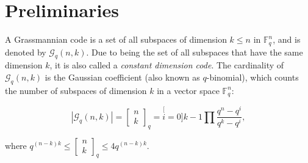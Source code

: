\chapter{Preliminaries} \label{chap:preliminaries}

\begin{defn}
 A Grassmannian code is a set of all subspaces of dimension $k\leq n$
in $\ensuremath{\mathbb{F}}_{q}^{n}$, and is denoted by $\mathcal{G}_{q}\left(n,k\right)$.
Due to being the set of all subspaces that have the same dimension
$k$, it is also called a \textit{constant dimension code}. The cardinality
of $\mathcal{G}_{q}\left(n,k\right)$ is the Gaussian coefficient
(also known as $q$-binomial), which counts the number of subspaces
of dimension $k$ in a vector space $\ensuremath{\mathbb{F}}_{q}^{n}$:

\[
\left|\mathcal{G}_{q}\left(n,k\right)\right|=\left[\begin{array}{c}
n\\
k
\end{array}\right]_{q}=\stackrel[i=0]{k-1}{\prod}\frac{q^{n}-q^{i}}{q^{k}-q^{i}},
\]

where $q^{\left(n-k\right)k}\leq\left[\begin{array}{c}
n\\
k
\end{array}\right]_{q}\leq4q^{\left(n-k\right)k}$.
\end{defn}

\clearpage